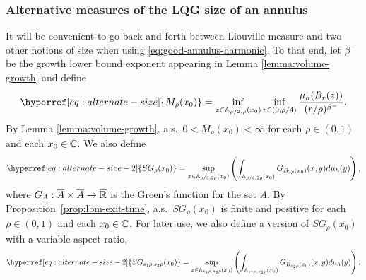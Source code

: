 \documentclass[12pt]{amsart}
\numberwithin{equation}{section}
\newcommand{\Mrho}[2]{\hyperref[eq:alternate-size]{M_{#1}(#2)}}
\newcommand{\SGrho}[2]{\hyperref[eq:alternate-size-2]{SG_{#1}(#2)}}
\newcommand{\SGrhofull}[4]{\hyperref[eq:alternate-size-2]{SG_{#3 #1, #4 #1}(#2)}}
\begin{document}
	\subsubsection{Alternative measures of the LQG size of an annulus}
	It will be convenient to go back and forth between Liouville measure and two other notions of size when using 
	\eqref{eq:good-annulus-harmonic}.  To that end, let $\beta^-$ be the growth lower bound exponent appearing in Lemma \ref{lemma:volume-growth} and define 
	\begin{equation} \label{eq:alternate-size}
	\Mrho{\rho}{x_0} = \inf_{z \in \A_{\rho/2, \rho}(x_0)} \inf_{r \in (0, \rho/4)} \frac{ \mu_h(B_r(z))}{ (r/\rho)^{\beta^-}} .
	\end{equation}
	By Lemma \ref{lemma:volume-growth}, a.s.\ $0 < \Mrho{\rho}{x_0} < \infty$ for each $\rho \in (0,1)$ and each $x_0 \in \mathbb{C}$. 
	We also define
	\begin{equation} \label{eq:alternate-size-2}
	\SGrho{\rho}{x_0} = \sup_{x \in \A_{\rho/4, 2 \rho}(x_0)} \left( \int_{\A_{\rho/4, 2 \rho}(x_0)} G_{B_{2 \rho}(x_0)}(x, y) d \mu_h(y) \right),
	\end{equation}
	where $G_{A}: \overline{A} \times \overline{A} \to \overline {\mathbb{R}}$ is the Green's function for the set $A$. 
	By Proposition~\ref{prop:lbm-exit-time}, a.s.\ $\SGrho{\rho}{x_0}$ is finite and positive for each $\rho\in (0,1)$ and each $x_0 \in \mathbb{C}$. 
	For later use, we also define a version of  $\SGrho{\rho}{x_0}$ with a variable aspect ratio,
	\begin{equation} \label{eq:alternate-size-2-full}
	\SGrhofull{\rho}{x_0}{s_1}{s_2} = \sup_{x \in \A_{s_1 \rho , s_2 \rho}(x_0)} \left( \int_{\A_{s_1 \rho, s_2 \rho}(x_0)} G_{B_{s_2 \rho}(x_0)}(x, y) d \mu_h(y) \right).
	\end{equation}
	
\end{document}
